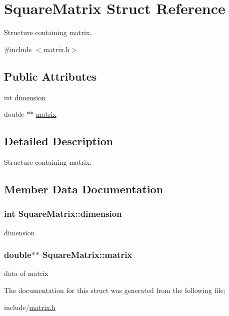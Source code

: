 \hypertarget{structSquareMatrix}{\section{\-Square\-Matrix \-Struct \-Reference}
\label{structSquareMatrix}
}


\-Structure containing matrix.  




{\ttfamily \#include $<$matrix.\-h$>$}

\subsection*{\-Public \-Attributes}
\begin{DoxyCompactItemize}
\item 
int \hyperlink{structSquareMatrix_aa2de1e8ab9af63ed6741146eb0845bb7}{dimension}
\item 
double $\ast$$\ast$ \hyperlink{structSquareMatrix_a110bf1ac8d92d943e29f0fa245fb0cfb}{matrix}
\end{DoxyCompactItemize}


\subsection{\-Detailed \-Description}
\-Structure containing matrix. 

\subsection{\-Member \-Data \-Documentation}
\hypertarget{structSquareMatrix_aa2de1e8ab9af63ed6741146eb0845bb7}{
\subsubsection[{dimension}]{\setlength{\rightskip}{0pt plus 5cm}int {\bf \-Square\-Matrix\-::dimension}}}\label{structSquareMatrix_aa2de1e8ab9af63ed6741146eb0845bb7}
dimension \hypertarget{structSquareMatrix_a110bf1ac8d92d943e29f0fa245fb0cfb}{
\subsubsection[{matrix}]{\setlength{\rightskip}{0pt plus 5cm}double$\ast$$\ast$ {\bf \-Square\-Matrix\-::matrix}}}\label{structSquareMatrix_a110bf1ac8d92d943e29f0fa245fb0cfb}
data of matrix 

\-The documentation for this struct was generated from the following file\-:\begin{DoxyCompactItemize}
\item 
include/\hyperlink{matrix_8h}{matrix.\-h}\end{DoxyCompactItemize}

